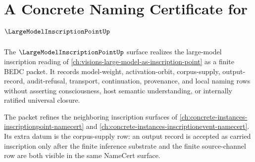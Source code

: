 \chapter{A Concrete Naming Certificate for $\LargeModelInscriptionPointUp$}
\label{ch:concrete-instances-largemodelinscriptionpoint-namecert}

The $\LargeModelInscriptionPointUp$ surface realizes the large-model inscription reading of \autoref{ch:visions-large-model-as-inscription-point} as a finite BEDC packet. It records model-weight, activation-orbit, corpus-supply, output-record, audit-refusal, transport, continuation, provenance, and local naming rows without asserting consciousness, host semantic understanding, or internally ratified universal closure.

The packet refines the neighboring inscription surfaces of \autoref{ch:concrete-instances-inscriptionpoint-namecert} and \autoref{ch:concrete-instances-inscriptionevent-namecert}. Its extra datum is the corpus-supply row: an output record is accepted as carried inscription only after the finite inference substrate and the finite source-channel row are both visible in the same NameCert surface.

